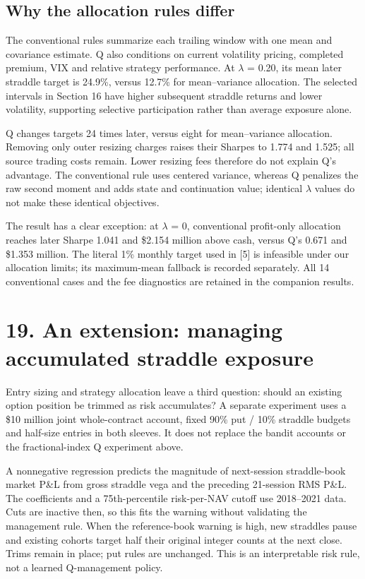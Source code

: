 \documentclass[11pt,letterpaper]{article}
\begin{document}
\subsection*{Why the allocation rules differ}
The conventional rules summarize each trailing window with one mean and covariance estimate. Q also conditions on current volatility pricing, completed premium, VIX and relative strategy performance. At \ensuremath{\lambda} = 0.20, its mean later straddle target is 24.9\%, versus 12.7\% for mean--variance allocation. The selected intervals in Section 16 have higher subsequent straddle returns and lower volatility, supporting selective participation rather than average exposure alone.

Q changes targets 24 times later, versus eight for mean--variance allocation. Removing only outer resizing charges raises their Sharpes to 1.774 and 1.525; all source trading costs remain. Lower resizing fees therefore do not explain Q's advantage. The conventional rule uses centered variance, whereas Q penalizes the raw second moment and adds state and continuation value; identical \ensuremath{\lambda} values do not make these identical objectives.

The result has a clear exception: at \ensuremath{\lambda} = 0, conventional profit-only allocation reaches later Sharpe 1.041 and \$2.154 million above cash, versus Q's 0.671 and \$1.353 million. The literal 1\% monthly target used in [5] is infeasible under our allocation limits; its maximum-mean fallback is recorded separately. All 14 conventional cases and the fee diagnostics are retained in the companion results.

\clearpage
\section*{19. An extension: managing accumulated straddle exposure}
Entry sizing and strategy allocation leave a third question: should an existing option position be trimmed as risk accumulates? A separate experiment uses a \$10 million joint whole-contract account, fixed 90\% put / 10\% straddle budgets and half-size entries in both sleeves. It does not replace the bandit accounts or the fractional-index Q experiment above.

A nonnegative regression predicts the magnitude of next-session straddle-book market P\&L from gross straddle vega and the preceding 21-session RMS P\&L. The coefficients and a 75th-percentile risk-per-NAV cutoff use 2018--2021 data. Cuts are inactive then, so this fits the warning without validating the management rule. When the reference-book warning is high, new straddles pause and existing cohorts target half their original integer counts at the next close. Trims remain in place; put rules are unchanged. This is an interpretable risk rule, not a learned Q-management policy.
\end{document}
